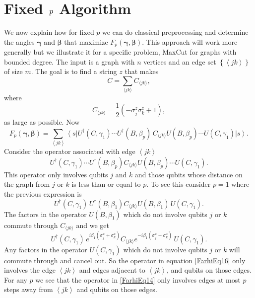 \documentclass[t11pt,reprint,preprint,preprintnumbers]{revtex4}
\newcommand{\bra}[1]{\left\langle #1 \right|}
\newcommand{\ket}[1]{\left|#1\right\rangle}
\newcommand{\brake}[1]{\left\langle#1\right\rangle}
\begin{document}
\section{Fixed $\protect\scalebox{1.25}{$\mathit{p}$}$ Algorithm}
 We now explain how for fixed $p$ we can do classical preprocessing and determine the angles $\boldsymbol{\gamma}$ and $\boldsymbol{\beta}$ that maximize $F_p (\boldsymbol{\gamma}, \boldsymbol{\beta})$. This approach will work more generally but we illustrate it for a specific problem, MaxCut for graphs with bounded degree. The input is a graph with $n$ vertices and an edge set $\left\{\brake{j k}\right\}$ of size $m$. The goal is to find a string $z$ that makes 
\begin{equation}
C = \sum_{\langle j k\rangle} C_{\langle j k\rangle},
\label{FarhiEq12}
\end{equation}
\noindent where
\begin{equation}
C_{\langle j k\rangle} = \frac{1}{2}\left (-\sigma^z_j \sigma^z_k +1 \right),
\end{equation}
as large as possible. Now
\begin{equation}
F_p (\boldsymbol{\gamma}, \boldsymbol{\beta}) = \sum_{\brake{j k}} \bra{s} U^\dagger (C, \gamma_1) \cdots U^\dagger (B, \beta_p)\, C_{\langle j k\rangle} U (B, \beta_p) \cdots U (C, \gamma_1) \ket{s} .
\label{FarhiEq13} 
\end{equation}
Consider the operator associated with edge $\brake{j k }$
\begin{equation}
U^\dagger (C, \gamma_1) \cdots U^\dagger (B, \beta_p) C_{\langle j k\rangle} U (B, \beta_p) \cdots U (C, \gamma_1).
\label{FarhiEq14}
\end{equation}
This operator only involves qubits $j$ and $k$ and those qubits whose distance on the graph from $j$ or $k$ is less than or equal to $p$. To see this consider $p=1$ where the previous expression is
\begin{equation}
U^\dagger (C, \gamma_1)\, U^\dagger (B, \beta_1) C_{\langle j k\rangle} U (B, \beta_1) \, U (C, \gamma_1) .
\label{FarhiEq15}
\end{equation}
The factors in the operator $U (B, \beta_1)$ which do not involve qubits $j$ or $k$ commute through $C_{\langle j k \rangle}$ and we get
\begin{equation}
U^\dagger (C, \gamma_1)\, e^{i \beta_1( \sigma^x_j + \sigma^x_k)}C_{\langle j k\rangle} e^{-i \beta_1 (\sigma^x_j + \sigma^x_k)}\, U (C, \gamma_1) .
\label{FarhiEq16}
\end{equation}
Any factors in the operator  $U (C,\gamma_1)$ which do not involve qubits $j$ or $k$  will commute through and cancel out. So the operator in equation \eqref{FarhiEq16} only involves 
the edge $\brake{jk}$ and edges adjacent to $\brake{jk}$, and qubits on those edges. For any $p$ we see that the operator in \eqref{FarhiEq14} only involves edges at most $p$ steps away from $\brake{jk}$ and qubits on those edges.
\end{document}
